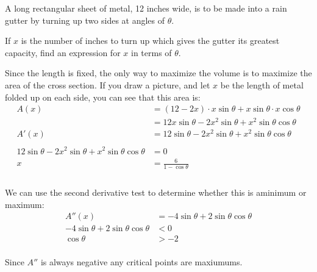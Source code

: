 \documentclass[fleqn,addpoints]{exam}
\begin{document}
\begin{questions}



\pagebreak


\bonusquestion[10] A long rectangular sheet of metal, 12 inches wide, is to be made into a rain gutter by turning up two
sides at angles of $\theta$.

If $x$ is the number of inches to turn up which gives the gutter its greatest capacity, find an expression for $x$ in terms of $\theta$.

\begin{solution}
Since the length is fixed, the only way to maximize the volume is to maximize the area of the cross section.  If you
draw a picture, and let $x$ be the length of metal folded up on each side, you can see that this area is:
\begin{align*}
  A(x) &= (12 - 2x) \cdot x \sin \theta + x \sin \theta \cdot x \cos \theta \\
    &= 12 x \sin \theta - 2x^2 \sin \theta + x^2 \sin \theta \cos \theta \\
  A'(x) &= 12 \sin \theta - 2x^2 \sin \theta + x^2 \sin \theta \cos \theta \\
\\
  12 \sin \theta - 2x^2 \sin \theta + x^2 \sin \theta \cos \theta &= 0 \\
  x &= \frac{6}{1 - \cos \theta} \\
\\
\end{align*}

We can use the second derivative test to determine whether this is  aminimum or maximum:
\begin{align*}
  A''(x) &= -4 \sin \theta + 2 \sin \theta \cos \theta \\
-4 \sin \theta + 2 \sin \theta \cos \theta &< 0 \\
  \cos \theta &> -2 \\
\end{align*}

Since $A''$ is always negative any critical points are maxiumums.

\end{solution}

\end{questions}
\end{document}
